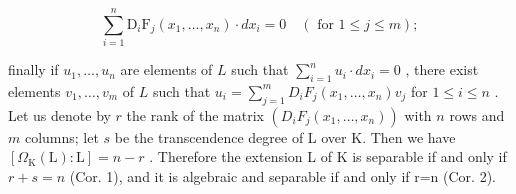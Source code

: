 \[
\sum_ {i = 1} ^ {n} \mathrm{D} _ {i} \mathrm{F} _ {j} (x _ {1}, \dots , x _ {n}) \cdot d x _ {i} = 0 \quad (\text { for } 1 \leqslant j \leqslant m);\tag{6}
\]

finally if \(u_1, \ldots, u_n\) are elements of \(L\) such that \(\sum_{i=1}^{n} u_i \cdot dx_i = 0\) , there exist elements \(v_1, \ldots, v_m\) of \(L\) such that \(u_i = \sum_{j=1}^{m} D_i F_j(x_1, \ldots, x_n) v_j\) for \(1 \leqslant i \leqslant n\) . Let us denote by \(r\) the rank of the matrix \((D_i F_j(x_1, \ldots, x_n))\) with \(n\) rows and \(m\) columns; let \(s\) be the transcendence degree of L over K. Then we have \([\Omega_{\mathrm{K}}(\mathrm{L}):\mathrm{L}]=n-r\) . Therefore the extension L of K is separable if and only if \(r+s=n\) (Cor. 1), and it is algebraic and separable if and only if r=n (Cor. 2).

